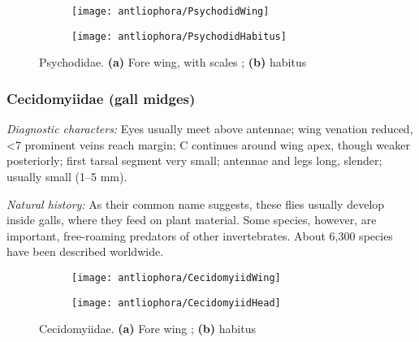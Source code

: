\begin{figure}[ht!]
    \centering
    \begin{subfigure}[ht!]{0.4\textwidth}
        \texttt{[image: antliophora/PsychodidWing]}
        \caption{}
        \label{fig:psychodid1}
    \end{subfigure}
    \qquad
    \begin{subfigure}[ht!]{0.45\textwidth}
        \texttt{[image: antliophora/PsychodidHabitus]}
        \caption{}
        \label{fig:psychodid2}
    \end{subfigure}
    \caption{Psychodidae. \textbf{(a)} Fore wing, with scales \citep[][Fig. 17.11]{mcalpine1981manual}; \textbf{(b)} habitus \citep[][Fig. 17.1]{mcalpine1981manual}}\label{fig:psychodids}
\end{figure}

\subsubsection{Cecidomyiidae (gall midges)}
\noindent{}\textit{Diagnostic characters:} Eyes usually meet above antennae; wing venation reduced, \textless7 prominent veins reach margin; C continues around wing apex, though weaker posteriorly; first tarsal segment very small; antennae and legs long, slender; usually small (1--5 mm).\vspace{3mm}

\noindent{}\textit{Natural history:} As their common name suggests, these flies usually develop inside galls, where they feed on plant material. Some species, however, are important, free-roaming predators of other invertebrates. About 6,300 species have been described worldwide.

\begin{figure}[ht!]
    \centering
    \begin{subfigure}[ht!]{0.45\textwidth}
        \texttt{[image: antliophora/CecidomyiidWing]}
        \caption{}
        \label{fig:cecidomyiid1}
    \end{subfigure}
    \qquad
    \begin{subfigure}[ht!]{0.25\textwidth}
        \texttt{[image: antliophora/CecidomyiidHead]}
        \caption{}
        \label{fig:cecidomyiid2}
    \end{subfigure}
    \caption{Cecidomyiidae. \textbf{(a)} Fore wing \citep[][Fig. 16.13]{mcalpine1981manual}; \textbf{(b)} habitus \citep[][Fig. 16.2]{mcalpine1981manual}}\label{fig:cecidomyiids}
\end{figure}

